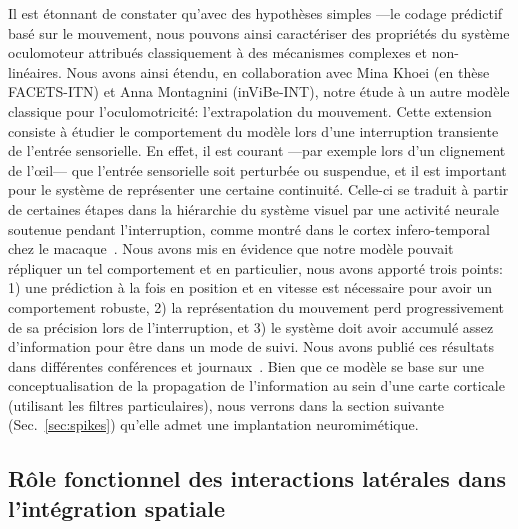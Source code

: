 \documentclass[11pt,french,a4paper,oneside]{article}%
\begin{document}
Il est étonnant de constater qu'avec des hypothèses simples ---le codage prédictif basé sur le mouvement, nous pouvons ainsi caractériser des propriétés du système oculomoteur attribués classiquement à des mécanismes complexes et non-linéaires. Nous avons ainsi étendu, en collaboration avec Mina Khoei (en thèse FACETS-ITN) et Anna Montagnini (inViBe-INT), notre étude à un autre modèle classique pour l'oculomotricité: l'extrapolation du mouvement. 
Cette extension consiste à étudier le comportement du modèle lors d'une interruption transiente de l'entrée sensorielle. En effet, il est courant ---par exemple lors d'un clignement de l'\oe il--- que l'entrée sensorielle soit perturbée ou suspendue, et il est important pour le système de représenter une certaine continuité. Celle-ci se traduit à partir de certaines étapes dans la hiérarchie du système visuel par une activité neurale soutenue pendant l'interruption, comme montré dans le cortex infero-temporal chez le macaque~\citep{Assad95}. Nous avons mis en évidence que notre modèle pouvait répliquer un tel comportement et en particulier, nous avons apporté trois points: 1) une prédiction à la fois en position et en vitesse est nécessaire pour avoir un comportement robuste, 2) la représentation du mouvement perd progressivement de sa précision lors de l'interruption, et 3) le système doit avoir accumulé assez d'information pour être dans un mode de suivi. Nous avons publié ces résultats dans différentes conférences et journaux~\citep{Khoei13jpp,KhoeiMassonPerrinet17}. Bien que ce modèle se base sur une conceptualisation de la propagation de l'information au sein d'une carte corticale (utilisant les filtres particulaires), nous verrons dans la section suivante (Sec.~\ref{sec:spikes}) qu'elle admet une implantation neuromimétique.

\subsection{Rôle fonctionnel des interactions latérales dans l'intégration spatiale~\citep{PerrinetBednar15}%
}%
\label{sec:PerrinetBednar15}%
\end{document}
